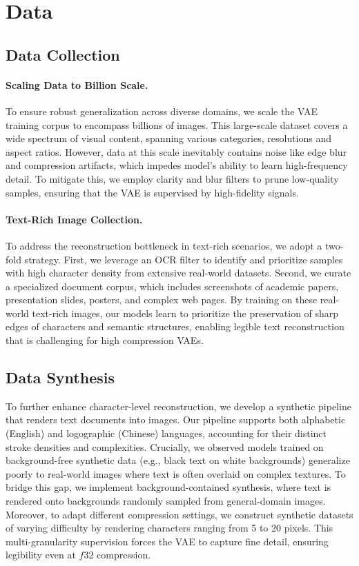 \section{Data}
\subsection{Data Collection}
\paragraph{Scaling Data to Billion Scale.} To ensure robust generalization across diverse domains, we scale the VAE training corpus to encompass billions of images. This large-scale dataset covers a wide spectrum of visual content, spanning various categories, resolutions and aspect ratios. However, data at this scale inevitably contains noise like edge blur and compression artifacts, which impedes model's ability to learn high-frequency detail. To mitigate this, we employ clarity and blur filters to prune low-quality samples, ensuring that the VAE is supervised by high-fidelity signals.

\paragraph{Text-Rich Image Collection.} To address the reconstruction bottleneck in text-rich scenarios, we adopt a two-fold strategy. First, we leverage an OCR filter to identify and prioritize samples with high character density from extensive real-world datasets. Second, we curate a specialized document corpus, which includes screenshots of academic papers, presentation slides, posters, and complex web pages. By training on these real-world text-rich images, our models learn to prioritize the preservation of sharp edges of characters and semantic structures, enabling legible text reconstruction that is challenging for high compression VAEs.

\subsection{Data Synthesis}
To further enhance character-level reconstruction, we develop a synthetic pipeline that renders text documents into images. Our pipeline supports both alphabetic (English) and logographic (Chinese) languages, accounting for their distinct stroke densities and complexities. Crucially, we observed models trained on background-free synthetic data (e.g., black text on white backgrounds) generalize poorly to real-world images where text is often overlaid on complex textures. To bridge this gap, we implement background-contained synthesis, where text is rendered onto backgrounds randomly sampled from general-domain images. Moreover, to adapt different compression settings, we construct synthetic datasets of varying difficulty by rendering characters ranging from 5 to 20 pixels. This multi-granularity supervision forces the VAE to capture fine detail, ensuring legibility even at $f32$ compression.
